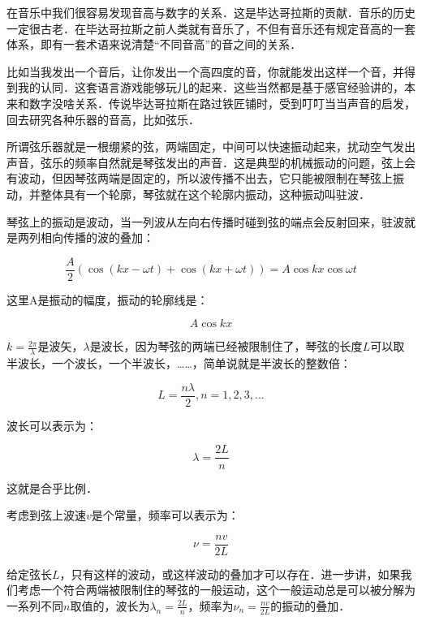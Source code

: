 在音乐中我们很容易发现音高与数字的关系．这是毕达哥拉斯的贡献．音乐的历史一定很古老．在毕达哥拉斯之前人类就有音乐了，不但有音乐还有规定音高的一套体系，即有一套术语来说清楚“不同音高”的音之间的关系．

比如当我发出一个音后，让你发出一个高四度的音，你就能发出这样一个音，并得到我的认同．这套语言游戏能够玩儿的起来．这些当然都是基于感官经验讲的，本来和数字没啥关系．传说毕达哥拉斯在路过铁匠铺时，受到叮叮当当声音的启发，回去研究各种乐器的音高，比如弦乐．

所谓弦乐器就是一根绷紧的弦，两端固定，中间可以快速振动起来，扰动空气发出声音，弦乐的频率自然就是琴弦发出的声音．这是典型的机械振动的问题，弦上会有波动，但因琴弦两端是固定的，所以波传播不出去，它只能被限制在琴弦上振动，并整体具有一个轮廓，琴弦就在这个轮廓内振动，这种振动叫驻波．

琴弦上的振动是波动，当一列波从左向右传播时碰到弦的端点会反射回来，驻波就是两列相向传播的波的叠加：

\begin{equation}
\frac{A}{2} \left( \cos ( kx - \omega t ) + \cos ( kx + \omega t ) \right) = A \cos kx \cos \omega t
\end{equation}

这里A是振动的幅度，振动的轮廓线是：

\begin{equation}
A \cos kx 
\end{equation}

$k = \frac{2 \pi}{\lambda}$是波矢，$\lambda$是波长，因为琴弦的两端已经被限制住了，琴弦的长度$L$可以取半波长，一个波长，一个半波长，……，简单说就是半波长的整数倍：

\begin{equation}
L = \frac{n \lambda}{2}, n = 1, 2, 3, ...
\end{equation}

波长可以表示为：

\begin{equation}
\lambda = \frac{2L}{n}
\end{equation}

这就是合乎比例．

考虑到弦上波速$v$是个常量，频率可以表示为：

\begin{equation}
\nu = \frac{n v}{2 L }
\end{equation}

给定弦长$L$，只有这样的波动，或这样波动的叠加才可以存在．进一步讲，如果我们考虑一个符合两端被限制住的琴弦的一般运动，这个一般运动总是可以被分解为一系列不同$n$取值的，波长为$\lambda_n = \frac{2L}{n}$，频率为$\nu_n = \frac{n v}{2 L }$的振动的叠加．

